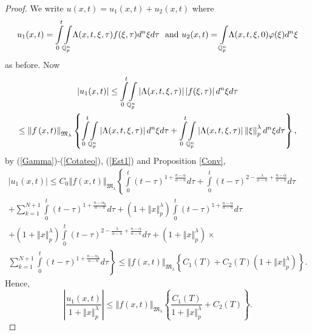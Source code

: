 \documentclass{amsart}\usepackage{amsfonts}
\theoremstyle{plain}
\numberwithin{equation}{section}
\begin{document}
\begin{proof}
We write $u(x,t)=u_{1}(x,t)+u_{2}(x,t)$ where\[
u_{1}(x,t)={\displaystyle\int\limits_{0}^{t}}
{\displaystyle\int\limits_{\mathbb{Q}_{p}^{n}}}
{\LARGE \Lambda}(x,t,\xi,\tau)f(\xi,\tau)d^{n}\xi d\tau\text{ \ and\ }u_{2}(x,t)={\displaystyle\int\limits_{\mathbb{Q}_{p}^{n}}}
{\LARGE \Lambda}(x,t,\xi,0)\varphi(\xi)d^{n}\xi
\]
as before. Now\begin{multline*}
\left\vert u_{1}(x,t)\right\vert \leq{\displaystyle\int\limits_{0}^{t}}
{\displaystyle\int\limits_{\mathbb{Q}_{p}^{n}}}
\left\vert {\LARGE \Lambda}(x,t,\xi,\tau)\right\vert \left\vert f(\xi
,\tau)\right\vert d^{n}\xi d\tau\\
\leq\left\Vert f\left(  x,t\right)  \right\Vert _{\mathfrak{M}_{\lambda}}\left\{
{\displaystyle\int\limits_{0}^{t}}
{\displaystyle\int\limits_{\mathbb{Q}_{p}^{n}}}
\left\vert {\LARGE \Lambda}(x,t,\xi,\tau)\right\vert d^{n}\xi d\tau+{\displaystyle\int\limits_{0}^{t}}
{\displaystyle\int\limits_{\mathbb{Q}_{p}^{n}}}
\left\vert {\LARGE \Lambda}(x,t,\xi,\tau)\right\vert \left\Vert \xi\right\Vert
_{p}^{\lambda}d^{n}\xi d\tau\right\}  ,
\end{multline*}
by (\ref{Gamma})-(\ref{Cotateo}), (\ref{Est1}) and Proposition \ref{Conv},\begin{multline*}
\left\vert u_{1}(x,t)\right\vert \leq C_{0}\left\Vert f\left(  x,t\right)
\right\Vert _{\mathfrak{M}_{\lambda}}\left\{
{\displaystyle\int\limits_{0}^{t}}
\left(  t-\tau\right)  ^{1+\frac{n-\alpha}{\alpha-n}}d\tau+{\displaystyle\int\limits_{0}^{t}}
\left(  t-\tau\right)  ^{2-\frac{\lambda}{\alpha-n}+\frac{n-\alpha}{\alpha-n}}d\tau\right. \\
+{\displaystyle\sum\limits_{k=1}^{N+1}}
{\displaystyle\int\limits_{0}^{t}}
\left(  t-\tau\right)  ^{1+\frac{n-\alpha_{k}}{\alpha-n}}d\tau+\left(
1+\left\Vert x\right\Vert _{p}^{\lambda}\right)
{\displaystyle\int\limits_{0}^{t}}
\left(  t-\tau\right)  ^{1+\frac{n-\alpha}{\alpha-n}}d\tau\\
+\left(  1+\left\Vert x\right\Vert _{p}^{\lambda}\right)
{\displaystyle\int\limits_{0}^{t}}
\left(  t-\tau\right)  ^{2-\frac{\lambda}{\alpha-n}+\frac{n-\alpha}{\alpha-n}}d\tau+\left(  1+\left\Vert x\right\Vert _{p}^{\lambda}\right)  \times\\
\left.
{\displaystyle\sum\limits_{k=1}^{N+1}}
{\displaystyle\int\limits_{0}^{t}}
\left(  t-\tau\right)  ^{1+\frac{n-\alpha_{k}}{\alpha-n}}d\tau\right\}
\leq\left\Vert f\left(  x,t\right)  \right\Vert _{\mathfrak{M}_{\lambda}}\left\{  C_{1}\left(  T\right)  +C_{2}\left(  T\right)  \left(  1+\left\Vert
x\right\Vert _{p}^{\lambda}\right)  \right\}  .
\end{multline*}
Hence,\
\[
\left\vert \frac{u_{1}(x,t)}{1+\left\Vert x\right\Vert _{p}^{\lambda}}\right\vert \leq\left\Vert f\left(  x,t\right)  \right\Vert _{\mathfrak{M}_{\lambda}}\left\{  \frac{C_{1}\left(  T\right)  }{1+\left\Vert x\right\Vert
_{p}^{\lambda}}+C_{2}\left(  T\right)  \right\}  .
\]



\end{proof}
\end{document}

